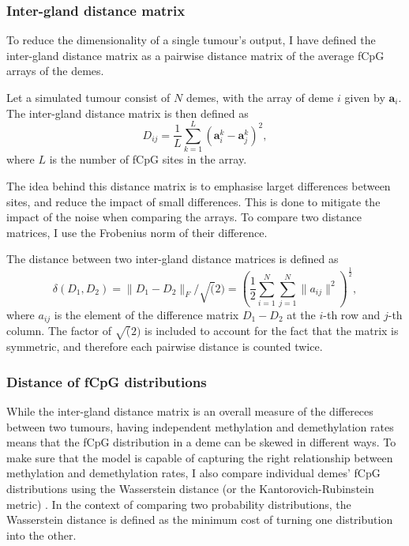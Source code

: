 \subsubsection{Inter-gland distance matrix}
To reduce the dimensionality of a single tumour's output, I have defined the
inter-gland distance matrix as a pairwise distance matrix of the average fCpG
arrays of the demes.
\begin{definition}
    Let a simulated tumour consist of $N$ demes, with the array of deme $i$
    given by $\mathbf{a}_i$. The inter-gland distance matrix is then defined as
    \begin{equation}
        D_{ij} = \frac{1}{L}\sum_{k=1}^L(\mathbf{a}_{i}^k-\mathbf{a}_{j}^k)^2,
    \end{equation}
    where $L$ is the number of fCpG sites in the array.
\end{definition}
The idea behind this distance matrix is to emphasise larget differences between
sites, and reduce the impact of small differences. This is done to mitigate the
impact of the noise when comparing the arrays. To compare two distance matrices,
I use the Frobenius norm of their difference.
\begin{definition}
    The distance between two inter-gland distance matrices is defined as
    \begin{equation}
        \delta(D_1, D_2) = \lVert D_1 - D_2 \rVert_F/\sqrt(2) =
        \left(\frac{1}{2}\sum_{i=1}^N\sum_{j=1}^N \lVert a_{ij}
        \rVert^2\right)^{\frac{1}{2}},
    \end{equation}
    where $a_{ij}$ is the element of the difference matrix $D_1-D_2$ at the
    $i$-th row and $j$-th column. The factor of $\sqrt(2)$ is included to
    account for the fact that the matrix is symmetric, and therefore each
    pairwise distance is counted twice.
\end{definition}

\subsubsection{Distance of fCpG distributions}
While the inter-gland distance matrix is an overall measure of the differeces
between two tumours, having independent methylation and demethylation rates
means that the fCpG distribution in a deme can be skewed in different ways. To
make sure that the model is capable of capturing the right relationship between
methylation and demethylation rates, I also compare individual demes' fCpG
distributions using the Wasserstein distance (or the Kantorovich-Rubinstein
metric) \cite{kantorovich_mathematical_1960}. In the context of comparing two
probability distributions, the Wasserstein distance is defined as the minimum
cost of turning one distribution into the other.


